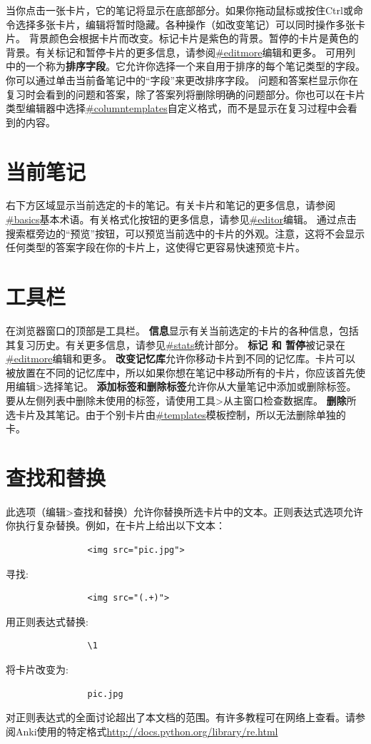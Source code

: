 \documentclass[a4paper]{book}
\newcounter{img}[chapter]
\begin{document}
			当你点击一张卡片，它的笔记将显示在底部部分。如果你拖动鼠标或按住Ctrl或命令选择多张卡片，编辑将暂时隐藏。各种操作（如改变笔记）可以同时操作多张卡片。
			背景颜色会根据卡片而改变。标记卡片是紫色的背景。暂停的卡片是黄色的背景。有关标记和暂停卡片的更多信息，请参阅\url{#editmore}编辑和更多。
			可用列中的一个称为\textbf{排序字段}。它允许你选择一个来自用于排序的每个笔记类型的字段。你可以通过单击当前备笔记中的“字段”来更改排序字段。
			问题和答案栏显示你在复习时会看到的问题和答案，除了答案列将删除明确的问题部分。你也可以在卡片类型编辑器中选择\url{#columntemplates}自定义格式，而不是显示在复习过程中会看到的内容。
			\section{当前笔记}
			右下方区域显示当前选定的卡的笔记。有关卡片和笔记的更多信息，请参阅\url{#basics}基本术语。有关格式化按钮的更多信息，请参见\url{#editor}编辑。
			通过点击搜索框旁边的“预览”按钮，可以预览当前选中的卡片的外观。注意，这将不会显示任何类型的答案字段在你的卡片上，这使得它更容易快速预览卡片。
			\section{工具栏}
			在浏览器窗口的顶部是工具栏。
			\textbf{信息}显示有关当前选定的卡片的各种信息，包括其复习历史。有关更多信息，请参见\url{#stats}统计部分。
			\textbf{标记 和 暂停}被记录在\url{#editmore}编辑和更多。
			\textbf{改变记忆库}允许你移动卡片到不同的记忆库。卡片可以被放置在不同的记忆库中，所以如果你想在笔记中移动所有的卡片，你应该首先使用编辑>选择笔记。
			\textbf{添加标签和删除标签}允许你从大量笔记中添加或删除标签。要从左侧列表中删除未使用的标签，请使用工具>从主窗口检查数据库。
			\textbf{删除}所选卡片及其笔记。由于个别卡片由\url{#templates}模板控制，所以无法删除单独的卡。
			\section{查找和替换}
			此选项（编辑>查找和替换）允许你替换所选卡片中的文本。正则表达式选项允许你执行复杂替换。例如，在卡片上给出以下文本：
			\begin{shaded}\begin{verbatim}
				<img src="pic.jpg">
				\end{verbatim}\end{shaded}
			寻找:
			\begin{shaded}\begin{verbatim}
				<img src="(.+)">
				\end{verbatim}\end{shaded}
			用正则表达式替换:
			\begin{shaded}\begin{verbatim}
				\1
				\end{verbatim}\end{shaded}
			将卡片改变为:
			\begin{shaded}\begin{verbatim}
				pic.jpg
				\end{verbatim}\end{shaded}
			对正则表达式的全面讨论超出了本文档的范围。有许多教程可在网络上查看。请参阅Anki使用的特定格式\url{http://docs.python.org/library/re.html}
\end{document}
